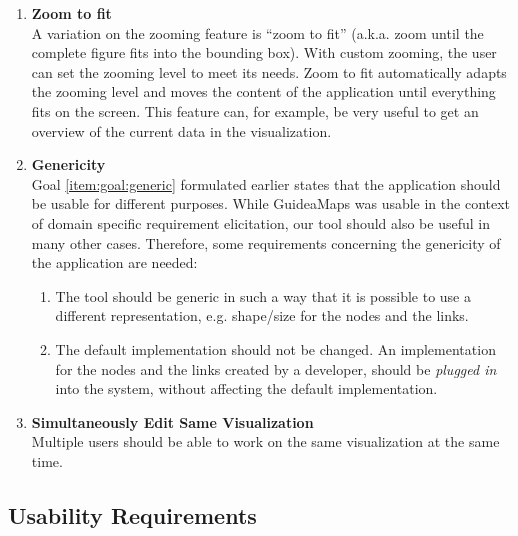 \begin{enumerate}[label=\textbf{\arabic*}., ref=\arabic*]
	\item \textbf{Zoom to fit\label{item:zoom-to-fit}} \hfill \\
	A variation on the zooming feature is ``zoom to fit'' (a.k.a. zoom until the complete figure fits into the bounding box). With custom zooming, the user can set the zooming level to meet its needs. Zoom to fit automatically adapts the zooming level and moves the content of the application until everything fits on the screen. This feature can, for example, be very useful to get an overview of the current data in the visualization.
		
	\item \textbf{Genericity\label{item:genericity}} \hfill \\
	Goal \ref{item:goal:generic} formulated earlier states that the application should be usable for different purposes. While GuideaMaps was usable in the context of domain specific requirement elicitation, our tool should also be useful in many other cases. Therefore, some requirements concerning the genericity of the application are needed:
  	\begin{enumerate}
		\item The tool should be generic in such a way that it is possible to use a different representation, e.g. shape/size for the nodes and the links.
		\item The default implementation should not be changed. An implementation for the nodes and the links created by a developer, should be \textit{plugged in} into the system, without affecting the default implementation.
	\end{enumerate}
	
	\item \textbf{Simultaneously Edit Same Visualization\label{item:work-simultaneously}} \hfill \\
	Multiple users should be able to work on the same visualization at the same time.
  
\end{enumerate}



\subsection{Usability Requirements}\label{sec:usability-requirements}

